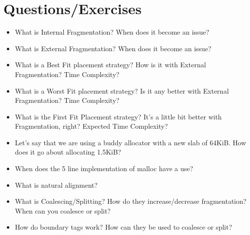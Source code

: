 \section{Questions/Exercises}

\begin{itemize}
\tightlist
\item
  What is Internal Fragmentation? When does it become an issue?
\item
  What is External Fragmentation? When does it become an issue?
\item
  What is a Best Fit placement strategy? How is it with External Fragmentation? Time Complexity?
\item
  What is a Worst Fit placement strategy? Is it any better with External Fragmentation? Time Complexity?
\item
  What is the First Fit Placement strategy? It's a little bit better with Fragmentation, right? Expected Time Complexity?
\item
  Let's say that we are using a buddy allocator with a new slab of 64KiB. How does it go about allocating 1.5KiB?
\item
  When does the 5 line  implementation of malloc have a use?
\item
  What is natural alignment?
\item
  What is Coalescing/Splitting? How do they increase/decrease fragmentation? When can you coalesce or split?
\item
  How do boundary tags work? How can they be used to coalesce or split?
\end{itemize}



